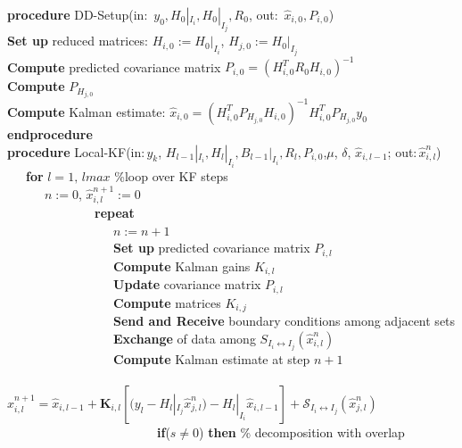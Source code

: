 \documentclass[smallcondensed]{svjour3}
\begin{document}
\begin{table}{}
\textbf{procedure} DD-Setup(in: $\,y_0,H_0|_{I_i},H_0|_{I_j},R_0$, out: $\,\widehat{x}_{i,0},P_{i,0}$)\\
\textbf{Set up} reduced matrices: $H_{i,0}:= H_0|_{I_i}$, $H_{j,0}:= H_0|_{I_j}$ \\
\textbf{Compute} predicted covariance matrix $P_{i,0}= (H_{i,0}^{T}R_{0}H_{i,0})^{-1}$ \\
\textbf{Compute} $P_{H_{j,0}}$ \\
\textbf{Compute}  Kalman estimate: $\widehat{x}_{i,0}= (H_{i,0}^{T}P_{H_{j,0}}H_{i,0})^{-1}H_{i,0}^{T}P_{H_{j,0}}y_{0}$ \\
\textbf{endprocedure}\\[1cm]
\textbf{procedure}  Local-KF(in:$\,y_{k}$, $H_{l-1}|_{I_{i}},H_{l}|_{I_{i}},B_{l-1}|_{I_{i}},R_{l},P_{i,0}$,$\mu$, $\delta$, $\widehat{x}_{i,l-1}$; out:$\,\widehat{x}_{i,l}^{n}$)\\
\ \ \ \textbf{for} $l=1,\,lmax$ \%loop over  KF steps \\
\ \ \ \ \ \ $n:=0$, $\widehat{x}_{i,l}^{n+1}:=0$\\
\ \ \ \ \ \ \ \ \ \ \ \ \ \ \textbf{repeat}\\
\ \ \ \ \ \ \ \ \ \ \ \ \ \  \ \ \ $n:=n+1$\\
\ \ \ \ \ \ \ \ \ \ \ \ \ \  \ \ \ \textbf{Set up}  predicted covariance matrix $P_{i,l}$ \\
\ \ \ \ \ \ \ \ \ \ \ \ \ \  \ \ \ \textbf{Compute} Kalman gains $K_{i,l}$ \\
\ \ \ \ \ \ \ \ \ \ \ \ \ \  \ \ \ \textbf{Update}  covariance matrix $P_{i,l}$ \\
\ \ \ \ \ \ \ \ \ \ \ \ \ \  \ \ \ \textbf{Compute} matrices $K_{i,j}$ \\
\ \ \ \ \ \ \ \ \ \ \ \ \ \  \ \ \ \textbf{Send and Receive} boundary conditions among adjacent sets\\
\ \ \ \ \ \ \ \ \ \ \ \ \ \  \ \ \ \textbf{Exchange} of data  among $S_{I_{i}\leftrightarrow I_j}(\widehat{x}_{i,l}^{n})$ \\
\ \ \ \ \ \ \ \ \ \ \ \ \ \  \ \ \ \textbf{Compute} Kalman estimate at step $n+1$\\ \ \ \ \ \ \ \ \ \ \ \ \ \ \  \ \ \ $\widehat{x}_{i,l}^{n+1}=\widehat{x}_{i,l-1}+\textbf{K}_{i,l}\left[({y}_{l}-{H}_{l}|_{I_{j}}\widehat{x}_{j,l}^{n})-H_{l}|_{I_{i}}\widehat{x}_{i,l-1}\right]+\mathcal{S}_{I_{i}\leftrightarrow I_{j}}(\widehat{x}_{j,l}^{n})$ \\
\ \ \ \ \ \ \ \ \ \ \ \ \ \  \ \ \ \ \ \ \ \ \ \ \textbf{if}($s\neq 0$) \textbf{then} \% decomposition with overlap  \\

\end{table}
\end{document}
